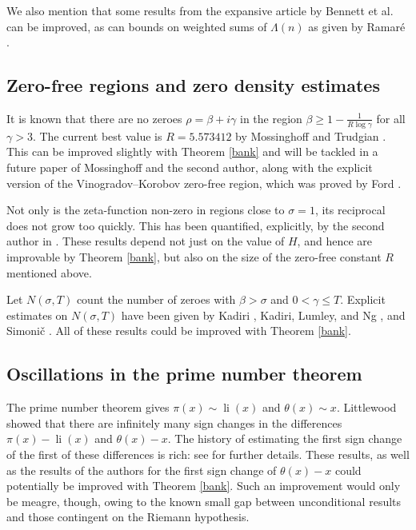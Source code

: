 \documentclass[12pt]{article}
\DeclareMathOperator{\li}{li}
\begin{document}
We also mention that some results from the expansive article by Bennett et al.\ \cite{Bennett} can be improved, as can bounds on weighted sums of $\Lambda(n)$ as given by Ramar\'{e} \cite{Ram}.

\subsection{Zero-free regions and zero density estimates}
%
It is known that there are no zeroes $\rho= \beta + i\gamma$ in the region $\beta \geq 1 - \frac{1}{R \log \gamma}$ for all $\gamma>3$. The current best value is $R = 5.573412$ by Mossinghoff and Trudgian \cite{Hoff}. This can be improved slightly with Theorem \ref{bank} and will be tackled in a future paper of Mossinghoff and the second author, along with the explicit version of the Vinogradov--Korobov zero-free region, which was proved by Ford \cite{Ford}.

Not only is the zeta-function non-zero in regions close to $\sigma =1$, its reciprocal does not grow too quickly. This has been quantified, explicitly, by the second author in \cite{Log}. These results depend not just on the value of $H$, and hence are improvable by Theorem \ref{bank}, but also on the size of the zero-free constant $R$ mentioned above.

Let $N(\sigma, T)$ count the number of zeroes with $\beta > \sigma$ and $0<\gamma\leq T$. Explicit estimates on $N(\sigma, T)$ have been given by Kadiri \cite{KS}, Kadiri, Lumley, and Ng \cite{KLN}, and Simoni\v{c} \cite{Aleks}. All of these results could be improved with Theorem \ref{bank}.

\subsection{Oscillations in the prime number theorem}
The prime number theorem gives $\pi(x) \sim \li(x)$ and $\theta(x) \sim x$. Littlewood \cite{Littlewood} showed that there are infinitely many sign changes in the differences $\pi(x) - \li(x)$ and $\theta(x) -x$. The history of estimating the first sign change of the first of these differences is rich: see \cite{Saouter,Smith} for further details. These results, as well as the results of the authors \cite{PT} for the first sign change of $\theta(x) -x$ could potentially be improved with Theorem \ref{bank}. Such an improvement would only be meagre, though, owing to the known small gap between unconditional results and those contingent on the Riemann hypothesis.
\end{document}
